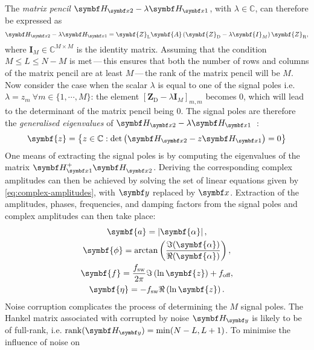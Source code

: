 The \emph{matrix pencil} $\Hxtwo - \lambda\Hxone$, with $\lambda \in
\mathbb{C}$, can therefore be expressed as
\begin{equation}
    \Hxtwo - \lambda \Hxone = \symbf{Z}_{\text{L}} \symbf{A} \left(
        \symbf{Z}_{\text{D}} - \lambda \symbf{I}_M
    \right) \symbf{Z}_{\text{R}},
\end{equation}
where $\symbf{I}_M \in \mathbb{C}^{M \times M}$ is the identity matrix.
Assuming that the condition $M \leq L \leq N - M$ is met\,---\,this ensures
that both the number of rows and columns of the matrix pencil are at least
$M$\,---\,the rank of the matrix pencil will be $M$.
Now consider the case when the scalar $\lambda$ is
equal to one of the signal poles i.e.  $\lambda = z_m\ \forall m \in
\lbrace 1, \cdots, M \rbrace$: the element $[\symbf{Z}_{\text{D}} -
\lambda \symbf{I}_M]_{m,m}$ becomes $0$, which will lead to the
determinant of the matrix pencil being $0$. The signal poles are therefore the
\emph{generalised eigenvalues} of $\Hxtwo - \lambda \Hxone$~\cite[Section
7.7]{Golub2013}:
\begin{equation}
    \symbf{z} = \left\lbrace
        z \in \mathbb{C} : \det\left(\Hxtwo - z \Hxone\right) = 0
    \right\rbrace
\end{equation}
One means of extracting the signal poles is by computing the eigenvalues of the
matrix $\Hxone^+ \Hxtwo^{\vphantom{+}}$. Deriving the corresponding complex
amplitudes can then be achieved by solving the set of linear equations given by
\cref{eq:complex-amplitudes}, with $\by$ replaced by $\bx$.
Extraction of the amplitudes, phases, frequencies, and damping factors from the
signal poles and complex amplitudes can then take place:%
\begin{subequations}%
    \begin{gather}
        \symbf{a} = \left \lvert \symbf{\alpha} \right \rvert,\\
        \symbf{\phi} = \arctan \left(\frac{\Im (\symbf{\alpha})}{\Re(\symbf{\alpha})}\right),\\
        \symbf{f} = \frac{\fsw}{2 \pi} \Im\left(\ln \symbf{z} \right) + \foff,\label{eq:poles-to-f}\\
        \symbf{\eta} = -\fsw \Re\left(\ln \symbf{z}\right).
    \end{gather}
\end{subequations}
Noise corruption complicates the process of
determining the $M$ signal poles. The Hankel matrix associated with
 corrupted by noise $\Hy$ is likely to be of full-rank, i.e.
$\rank(\Hy) = \min(N - L, L + 1)$. To minimise the influence of noise on
